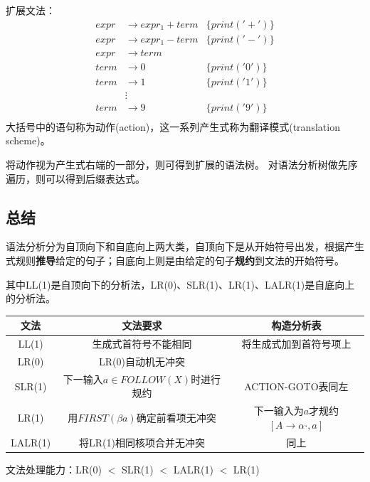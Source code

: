 扩展文法：
\[\begin{array}{rll}
expr &\to expr_1 + term & \{print('+')\}\\
expr &\to expr_1 - term & \{print('-')\}\\
expr &\to term & \\
term &\to 0    & \{print('0')\}\\
term &\to 1    & \{print('1')\}\\
     &\vdots   & \\
term &\to 9    & \{print('9')\}\\
\end{array}\]
大括号中的语句称为动作(action)，这一系列产生式称为翻译模式(translation scheme)。

将动作视为产生式右端的一部分，则可得到扩展的语法树。
对语法分析树做先序遍历，则可以得到后缀表达式。

\subsection{总结}
语法分析分为自顶向下和自底向上两大类，自顶向下是从开始符号出发，根据产生式规则\textbf{推导}给定的句子；自底向上则是由给定的句子\textbf{规约}到文法的开始符号。

其中LL(1)是自顶向下的分析法，LR(0)、SLR(1)、LR(1)、LALR(1)是自底向上的分析法。
\begin{center}
\begin{tabular}{|c|c|c|}\\\hline
文法 & 文法要求 & 构造分析表 \\\hline
LL(1) & 生成式首符号不能相同 & 将生成式加到首符号项上\\\hline
LR(0) & LR(0)自动机无冲突 & \\\hline
SLR(1) & 下一输入$a\in FOLLOW(X)$时进行规约 & ACTION-GOTO表同左\\\hline
LR(1) & 用$FIRST(\beta a)$确定前看项无冲突 & 下一输入为$a$才规约$[A\to\alpha\cdot,a]$\\\hline
LALR(1) & 将LR(1)相同核项合并无冲突 & 同上\\\hline
\end{tabular}
\end{center}


文法处理能力：LR(0) $<$ SLR(1) $<$ LALR(1) $<$ LR(1)